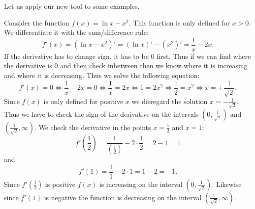 \documentclass[main.tex]{subfiles}
\begin{document}
Let us apply our new tool to some examples.
\begin{example}[label=ex:logSquare]
Consider the function $f(x) = \ln x - x^2$. This function is only defined for $x > 0$. We differentiate it with the sum/difference rule:
\begin{equation}
f'(x) = \left(\ln x - x^2 \right)' = \left( \ln x \right)' - \left( x^2 \right)' = \frac{1}{x} - 2 x.
\end{equation}
If the derivative has to change sign, it has to be $0$ first. Thus if we can find where the derivative is $0$ and then check inbetween then we know where it is increasing and where it is decreasing. Thus we solve the following equation:
\begin{equation}
f'(x) = 0 \Leftrightarrow \frac{1}{x} - 2 x = 0 \Leftrightarrow \frac{1}{x} = 2 x \Leftrightarrow 1 = 2 x^2 \Leftrightarrow \frac{1}{2} = x^2 \Leftrightarrow x = \pm \frac{1}{\sqrt{2}}.
\end{equation}
Since $f(x)$ is only defined for positive $x$ we disregard the solution $x = - \frac{1}{\sqrt{2}}$. Thus we have to check the sign of the derivative on the intervals $\left( 0, \frac{1}{\sqrt{2}} \right)$ and $\left( \frac{1}{\sqrt{2}}, \infty \right)$. We check the derivative in the points $x = \frac{1}{2}$ and $x = 1$:
\begin{equation}
f' \left( \frac{1}{2} \right) = \frac{1}{\left( \frac{1}{2}\right)} - 2 \cdot \frac{1}{2} = 2 - 1 = 1
\end{equation}
and
\begin{equation}
f'(1) = \frac{1}{1} - 2 \cdot 1 = 1 - 2 = -1.
\end{equation}
Since $f' \left( \frac{1}{2} \right)$ is positive $f(x)$ is increasing on the interval $\left( 0, \frac{1}{\sqrt{2}} \right)$. Likewise since $f'(1)$ is negative the function is decreasing on the interval $\left( \frac{1}{\sqrt{2}}, \infty \right)$.
\end{example}
\end{document}
